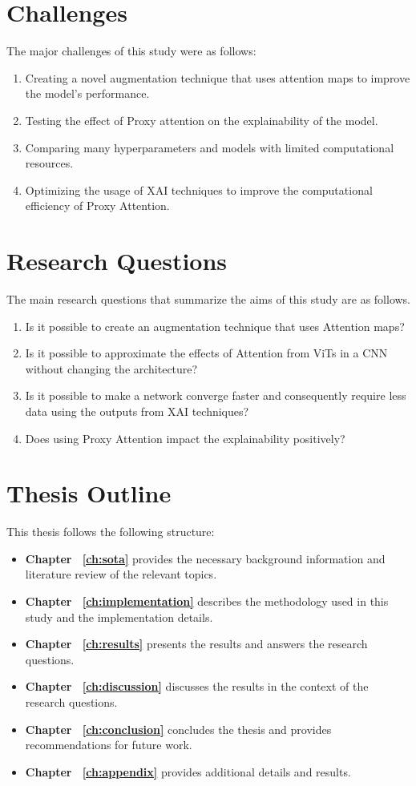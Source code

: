\section{Challenges}
The major challenges of this study were as follows:
\begin{enumerate}
    \item Creating a novel augmentation technique that uses attention maps to improve the model's performance.
    \item Testing the effect of Proxy attention on the explainability of the model.
    \item Comparing many hyperparameters and models with limited computational resources.
    \item Optimizing the usage of XAI techniques to improve the computational efficiency of Proxy Attention.
\end{enumerate}

\section{Research Questions} \label{section:researchq}
The main research questions that summarize the aims of this study are as follows.
\begin{enumerate}
    \item Is it possible to create an augmentation technique that uses Attention maps?
    \item Is it possible to approximate the effects of Attention from ViTs in a CNN without changing the architecture?
    \item Is it possible to make a network converge faster and consequently require less data using the outputs from XAI techniques?
    \item Does using Proxy Attention impact the explainability positively?
\end{enumerate}
\section{Thesis Outline}
This thesis follows the following structure:
\begin{itemize}
    \item \textbf{Chapter ~\ref{ch:sota}} provides the necessary background information and literature review of the relevant topics.
    \item \textbf{Chapter ~\ref{ch:implementation}} describes the methodology used in this study and the implementation details.
    \item \textbf{Chapter ~\ref{ch:results}} presents the results and answers the research questions.
    \item \textbf{Chapter ~\ref{ch:discussion}} discusses the results in the context of the research questions.
    \item \textbf{Chapter ~\ref{ch:conclusion}} concludes the thesis and provides recommendations for future work.
    \item \textbf{Chapter ~\ref{ch:appendix}} provides additional details and results.
\end{itemize}

